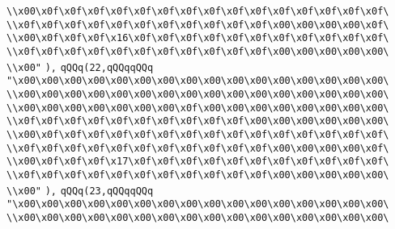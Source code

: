 \verb|\\x00\x0f\x0f\x0f\x0f\x0f\x0f\x0f\x0f\x0f\x0f\x0f\x0f\x0f\x0f\x0f\|\newline
\verb|\\x0f\x0f\x0f\x0f\x0f\x0f\x0f\x0f\x0f\x0f\x0f\x00\x00\x00\x00\x0f\|\newline
\verb|\\x00\x0f\x0f\x0f\x16\x0f\x0f\x0f\x0f\x0f\x0f\x0f\x0f\x0f\x0f\x0f\|\newline
\verb|\\x0f\x0f\x0f\x0f\x0f\x0f\x0f\x0f\x0f\x0f\x0f\x00\x00\x00\x00\x00\|\newline
\verb|\\x00"|\newline
\verb|),|\newline
\verb|qQQq(22,qQQqqQQq|\newline
\verb|"\x00\x00\x00\x00\x00\x00\x00\x00\x00\x00\x00\x00\x00\x00\x00\x00\|\newline
\verb|\\x00\x00\x00\x00\x00\x00\x00\x00\x00\x00\x00\x00\x00\x00\x00\x00\|\newline
\verb|\\x00\x00\x00\x00\x00\x00\x00\x0f\x00\x00\x00\x00\x00\x00\x00\x00\|\newline
\verb|\\x0f\x0f\x0f\x0f\x0f\x0f\x0f\x0f\x0f\x0f\x00\x00\x00\x00\x00\x00\|\newline
\verb|\\x00\x0f\x0f\x0f\x0f\x0f\x0f\x0f\x0f\x0f\x0f\x0f\x0f\x0f\x0f\x0f\|\newline
\verb|\\x0f\x0f\x0f\x0f\x0f\x0f\x0f\x0f\x0f\x0f\x0f\x00\x00\x00\x00\x0f\|\newline
\verb|\\x00\x0f\x0f\x0f\x17\x0f\x0f\x0f\x0f\x0f\x0f\x0f\x0f\x0f\x0f\x0f\|\newline
\verb|\\x0f\x0f\x0f\x0f\x0f\x0f\x0f\x0f\x0f\x0f\x0f\x00\x00\x00\x00\x00\|\newline
\verb|\\x00"|\newline
\verb|),|\newline
\verb|qQQq(23,qQQqqQQq|\newline
\verb|"\x00\x00\x00\x00\x00\x00\x00\x00\x00\x00\x00\x00\x00\x00\x00\x00\|\newline
\verb|\\x00\x00\x00\x00\x00\x00\x00\x00\x00\x00\x00\x00\x00\x00\x00\x00\|\newline
